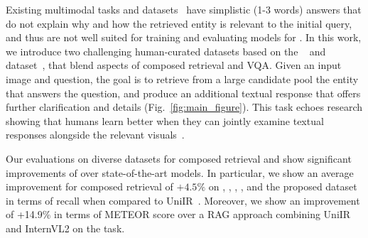 %
Existing multimodal tasks and datasets~\cite{hu2023open, kazemzadeh2014referitgame, chen2023can, wu2021fashion, liu2021image} have simplistic (1-3 words) answers that do not explain why and how the retrieved entity is relevant to the initial query, and thus are not well suited for training and evaluating models for  \tasknameshort.
In this work, we introduce two challenging human-curated \tasknameshort datasets based on the \cirr~\cite{Liu_2021_ICCV} and \wikimm dataset~\cite{burns2023wiki}, that blend aspects of composed retrieval and VQA. 
Given an input image and question, the goal is to retrieve from a large candidate pool the entity that answers the question, and produce an additional textual response that offers further clarification and details (Fig.~\ref{fig:main_figure}). 
This task echoes research showing that humans learn better when they can jointly examine textual responses alongside the relevant visuals~\cite{mayer2003three}.
%
%

%
Our evaluations on diverse datasets for composed retrieval and \taskname show significant improvements of \modelname over state-of-the-art models.
In particular, we show an average improvement for composed retrieval of $+4.5\%$ on \fashioniq, \cirr, \oven, \infoseek, and the proposed \wikicomment dataset in terms of recall when compared to UniIR~\cite{wei2023uniir}.
Moreover, we show an improvement of +14.9\% in terms of METEOR score over a RAG approach combining UniIR and InternVL2 on the \tasknameshort task.
%


%
%